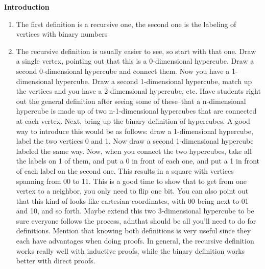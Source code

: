 \item \textbf{Introduction}
\begin{enumerate}[label=*]
\item The first definition is a recursive one, the second one is the labeling of vertices with binary numbers
\item The recursive definition is usually easier to see, so start with that one. Draw a single vertex, pointing out that this is a 0-dimensional hypercube. Draw a second 0-dimensional hypercube and connect them. Now you have a 1-dimensional hypercube. Draw a second 1-dimensional hypercube, match up the vertices and you have a 2-dimensional hypercube, etc. Have students right out the general definition after seeing some of these--that a n-dimensional hypercube is made up of two n-1-dimensional hypercubes that are connected at each vertex.
Next, bring up the binary definition of hypercubes. A good way to introduce this would be as follows: draw a 1-dimensional hypercube, label the two vertices 0 and 1. Now draw a second 1-dimensional hypercube labeled the same way. Now, when you connect the two hypercubes, take all the labels on 1 of them, and put a 0 in front of each one, and put a 1 in front of each label on the second one. This results in a square with vertices spanning from 00 to 11. This is a good time to show that to get from one vertex to a neighbor, you only need to flip one bit. You can also point out that this kind of looks like cartesian coordinates, with 00 being next to 01 and 10, and so forth. Maybe extend this two 3-dimensional hypercube to be sure everyone follows the process, adnthat should be all you’ll need to do for definitions.
Mention that knowing both definitions is very useful since they each have advantages when doing proofs. In general, the recursive definition works really well with inductive proofs, while the binary definition works better with direct proofs. 
\end{enumerate}